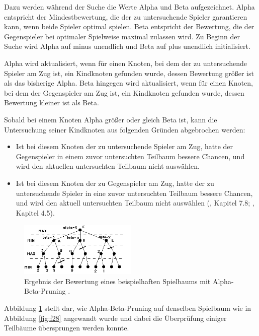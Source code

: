 Dazu werden während der Suche die Werte Alpha und Beta aufgezeichnet. Alpha entspricht der Mindestbewertung, die der zu untersuchende Spieler garantieren kann, wenn beide Spieler optimal spielen. Beta entspricht der Bewertung, die der Gegenspieler bei optimaler Spielweise maximal zulassen wird. Zu Beginn der Suche wird Alpha auf minus unendlich und Beta auf plus unendlich initialisiert.

Alpha wird aktualisiert, wenn für einen Knoten, bei dem der zu untersuchende Spieler am Zug ist, ein Kindknoten gefunden wurde, dessen Bewertung größer ist als das bisherige Alpha. Beta hingegen wird aktualisiert, wenn für einen Knoten, bei dem der Gegenspieler am Zug ist, ein Kindknoten gefunden wurde, dessen Bewertung kleiner ist als Beta.

Sobald bei einem Knoten Alpha größer oder gleich Beta ist, kann die Untersuchung seiner Kindknoten aus folgenden Gründen abgebrochen werden:

\begin{itemize}
	\item Ist bei diesem Knoten der zu untersuchende Spieler am Zug, hatte der Gegenspieler in einem zuvor untersuchten Teilbaum bessere Chancen, und wird den aktuellen untersuchten Teilbaum nicht auswählen.
	\item Ist bei diesem Knoten der zu Gegenspieler am Zug, hatte der zu untersuchende Spieler in eine zuvor untersuchten Teilbaum bessere Chancen, und wird den aktuell untersuchten Teilbaum nicht auswählen (\cite{Heineman.October2008}, Kapitel 7.8; \cite{Ferguson.January2019}, Kapitel 4.5).
\end{itemize}

\begin{figure}[ht!]%
	\includegraphics[width=0.5\textwidth, center]{Bilder/alphabeta.png}
	\caption[Ergebnis der Bewertung eines beispielhaften Spielbaums mit Alpha-Beta-Pruning.]{Ergebnis der Bewertung eines beispielhaften Spielbaums mit Alpha-Beta-Pruning \cite{Morelli_Minimax}.}
	\label{fig:f29}
\end{figure}

Abbildung \ref{fig:f29} stellt dar, wie Alpha-Beta-Pruning auf denselben Spielbaum wie in Abbildung \ref{fig:f28} angewandt wurde und dabei die Überprüfung einiger Teilbäume übersprungen werden konnte.

